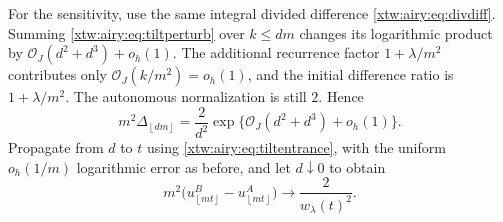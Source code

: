 \documentclass[11pt]{article}
\theoremstyle{remark}\newtheorem{remark}[theorem]{Remark}
\newcommand{\OO}{\mathcal O}
\newcommand{\floor}[1]{\left\lfloor #1\right\rfloor}
\begin{document}
For the sensitivity, use the same integral divided difference
\eqref{xtw:airy:eq:divdiff}. Summing \eqref{xtw:airy:eq:tiltperturb} over $k\le dm$ changes its
logarithmic product by $\OO_J(d^2+d^3)+o_h(1)$. The additional recurrence
factor $1+\lambda/m^2$ contributes only $\OO_J(k/m^2)=o_h(1)$, and the
initial difference ratio is $1+\lambda/m^2$. The autonomous normalization is
still $2$. Hence
\[
 m^2\Delta_{\floor{dm}}=\frac2{d^2}
       \exp\{\OO_J(d^2+d^3)+o_h(1)\}.
\]
Propagate from $d$ to $t$ using \eqref{xtw:airy:eq:tiltentrance}, with the uniform
$o_h(1/m)$ logarithmic error as before, and let $d\downarrow0$ to obtain
\begin{equation}\label{xtw:airy:eq:tiltsensitivity}
 m^2\bigl(u_{\floor{mt}}^B-u_{\floor{mt}}^A\bigr)
       \longrightarrow\frac2{w_\lambda(t)^2}.
\end{equation}
\end{document}
